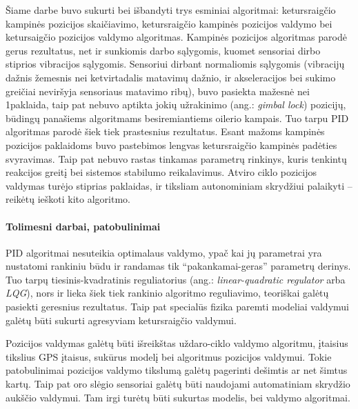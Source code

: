 \documentclass[12pt, a4paper, lithuanian, final]{article}
\begin{document}
Šiame darbe buvo sukurti bei išbandyti trys esminiai algoritmai: ketursraigčio kampinės pozicijos skaičiavimo, ketursraigčio kampinės pozicijos valdymo bei ketursaigčio pozicijos valdymo algoritmas.
Kampinės pozicijos algoritmas parodė gerus rezultatus, net ir sunkiomis darbo sąlygomis, kuomet sensoriai dirbo stiprios vibracijos sąlygomis.
Sensoriui dirbant normaliomis sąlygomis (vibracijų dažnis žemesnis nei ketvirtadalis matavimų dažnio, ir akseleracijos bei sukimo greičiai neviršyja sensoriaus matavimo ribų), buvo pasiekta mažesnė nei 1\degree paklaida, taip pat nebuvo aptikta jokių užrakinimo (ang.: \textit{gimbal lock}) pozicijų, būdingų panašiems algoritmams besiremiantiems oilerio kampais.
Tuo tarpu PID algoritmas parodė šiek tiek prastesnius rezultatus.
Esant mažoms kampinės pozicijos paklaidoms buvo pastebimos lengvas ketursraigčio kampinės padėties svyravimas.
Taip pat nebuvo rastas tinkamas parametrų rinkinys, kuris tenkintų reakcijos greitį bei sistemos stabilumo reikalavimus.
Atviro ciklo pozicijos valdymas turėjo stiprias paklaidas, ir tiksliam autonominiam skrydžiui palaikyti -- reikėtų ieškoti kito algoritmo.


\paragraph{Tolimesni darbai, patobulinimai}

PID algoritmai nesuteikia optimalaus valdymo, ypač kai jų parametrai yra nustatomi rankiniu būdu ir randamas tik "`pakankamai-geras"' parametrų derinys.
Tuo tarpų tiesinis-kvadratinis reguliatorius (ang.: \textit{linear-quadratic regulator} arba \textit{LQG}), nors ir lieka šiek tiek rankinio algoritmo reguliavimo, teoriškai galėtų pasiekti geresnius rezultatus.
Taip pat specialūs fizika paremti modeliai valdymui galėtų būti sukurti agresyviam ketursraigčio valdymui.

Pozicijos valdymas galėtų būti išreikštas uždaro-ciklo valdymo algoritmu, įtaisius tikslius GPS įtaisus, sukūrus modelį bei algoritmus pozicijos valdymui.
Tokie patobulinimai pozicijos valdymo tikslumą galėtų pagerinti dešimtis ar net šimtus kartų.
Taip pat oro slėgio sensoriai galėtų būti naudojami automatiniam skrydžio aukščio valdymui.
Tam irgi turėtų būti sukurtas modelis, bei valdymo algoritmai.
\end{document}
